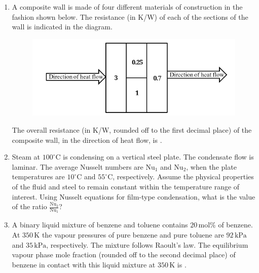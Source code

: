 \documentclass[journal,12pt,onecolumn]{IEEEtran}
\theoremstyle{remark}
\begin{document}
\begin{enumerate}
\item A composite wall is made of four different materials of construction in the fashion shown below. The resistance (in K/W) of each of the sections of the wall is indicated in the diagram.
\begin{figure}[H]
    \centering
    \includegraphics[width=0.5\columnwidth]{figs/qn 9.jpg}
    \caption{}
    \label{fig:qn 19.jpg}
\end{figure}

The overall resistance (in K/W, rounded off to the first decimal place) of the composite wall, in the direction of heat flow, is \underline{\hspace{1cm}}.
\hfill{}

\item Steam at $100^\circ\text{C}$ is condensing on a vertical steel plate. The condensate flow is laminar. The average Nusselt numbers are $\text{Nu}_1$ and $\text{Nu}_2$, when the plate temperatures are $10^\circ\text{C}$ and $55^\circ\text{C}$, respectively. Assume the physical properties of the fluid and steel to remain constant within the temperature range of interest. Using Nusselt equations for film-type condensation, what is the value of the ratio $\frac{\text{Nu}_2}{\text{Nu}_1}$?
\hfill{}
\begin{enumerate}
\end{enumerate}

\item A binary liquid mixture of benzene and toluene contains $20 \, \text{mol}\%$ of benzene. At $350 \, \text{K}$ the vapour pressures of pure benzene and pure toluene are $92 \, \text{kPa}$ and $35 \, \text{kPa}$, respectively. The mixture follows Raoult's law. The equilibrium vapour phase mole fraction (rounded off to the second decimal place) of benzene in contact with this liquid mixture at $350 \, \text{K}$ is \underline{\hspace{1cm}}.
\hfill{}


\end{enumerate}
\end{document}
